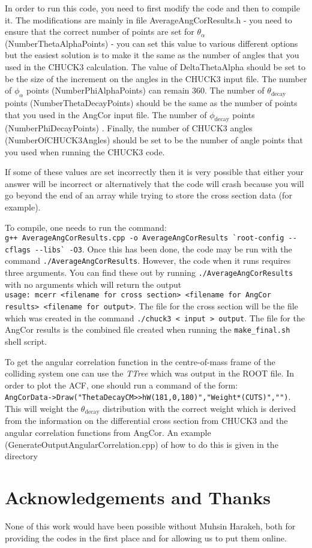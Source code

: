 \documentclass[a4paper,10pt]{article}
\begin{document}
In order to run this code, you need to first modify the code and then to compile it. The modifications are mainly in file AverageAngCorResults.h - you need to ensure that the correct number of points are set for $\theta_\alpha$ (NumberThetaAlphaPoints) - you can set this value to various different options but the easiest solution is to make it the same as the number of angles that you used in the CHUCK3 calculation. The value of DeltaThetaAlpha should be set to be the size of the increment on the angles in the CHUCK3 input file. The number of $\phi_\alpha$ points (NumberPhiAlphaPoints) can remain 360. The number of $\theta_\mathrm{decay}$ points (NumberThetaDecayPoints) should be the same as the number of points that you used in the AngCor input file. The number of $\phi_\mathrm{decay}$ points (NumberPhiDecayPoints) . Finally, the number of CHUCK3 angles (NumberOfCHUCK3Angles) should be set to be the number of angle points that you used when running the CHUCK3 code.

If some of these values are set incorrectly then it is very possible that either your answer will be incorrect or alternatively that the code will crash because you will go beyond the end of an array while trying to store the cross section data (for example).

To compile, one needs to run the command:\\
\lstinline!g++ AverageAngCorResults.cpp -o AverageAngCorResults `root-config --cflags --libs` -O3!. Once this has been done, the code may be run with the command \lstinline!./AverageAngCorResults!. However, the code when it runs requires three arguments. You can find these out by running \lstinline!./AverageAngCorResults! with no arguments which will return the output\\ \lstinline!usage: mcerr <filename for cross section> <filename for AngCor results> <filename for output>!. The file for the cross section will be the file which was created in the command \lstinline!./chuck3 < input > output!. The file for the AngCor results is the combined file created when running the \lstinline!make_final.sh! shell script.
 
To get the angular correlation function in the centre-of-mass frame of the colliding system one can use the {\it TTree} which was output in the ROOT file. In order to plot the ACF, one should run a command of the form:\\ \lstinline!AngCorData->Draw("ThetaDecayCM>>hW(181,0,180)","Weight*(CUTS)","")!. This will weight the $\theta_{\mathrm{decay}}$ distribution with the correct weight which is derived from the information on the differential cross section from CHUCK3 and the angular correlation functions from AngCor. An example (GenerateOutputAngularCorrelation.cpp) of how to do this is given in the directory 

\section{Acknowledgements and Thanks}

None of this work would have been possible without Muhsin Harakeh, both for providing the codes in the first place and for allowing us to put them online.
\end{document}
